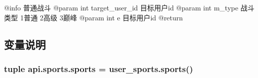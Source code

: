 \begin{DoxyVerb}@info 普通战斗
@param int target_user_id 目标用户id
@param int m_type 战斗类型 1普通 2高级 3巅峰
@param int e 目标用户id
@return
\end{DoxyVerb}
 

\subsection{变量说明}
\hypertarget{namespaceapi_1_1sports_afc81cc67948e6b480a208956ece066e7}{
\subsubsection[{sports}]{\setlength{\rightskip}{0pt plus 5cm}tuple api.\-sports.\-sports = user\-\_\-sports.\-sports()}}\label{namespaceapi_1_1sports_afc81cc67948e6b480a208956ece066e7}
